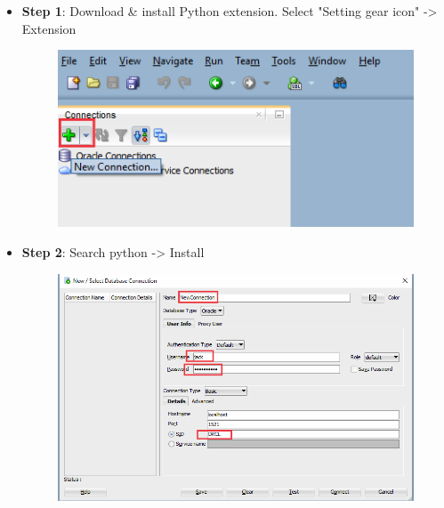 \setlength{\columnsep}{5pt}
\begin{flushleft}

	\begin{itemize}
		\item \textbf{Step 1}:
		\newline
		Download \& install Python extension.
		\newline
		Select "Setting gear icon" -> Extension 
		
		\begin{figure}[h!]
			\centering
			\includegraphics[scale=.3]{content/chapter1/images/image1.png}
		\end{figure}
	
		\item \textbf{Step 2}:
		Search python -> Install
		\begin{figure}[h!]
			\centering
			\includegraphics[scale=.3]{content/chapter1/images/image2.png}
		\end{figure}

	\end{itemize}

	
\end{flushleft}
\newpage
